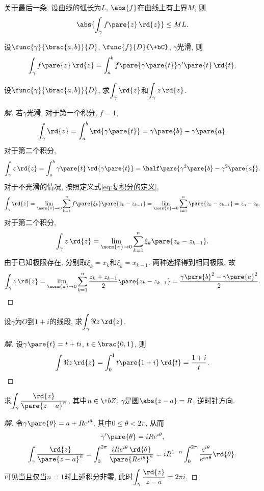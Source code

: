 \documentclass[../ComplexVariable.tex]{subfiles}
\begin{document}
关于最后一条, 设曲线的弧长为$L$, $\abs{f}$在曲线上有上界$M$, 则
\[ \abs{\int_\gamma f\pare{z}\,\rd{z}} \le ML. \]
\begin{proposition}
    设$\func{\gamma}{\brac{a,b}}{D}$, $\func{f}{D}{\+bC}$, $\gamma$光滑, 则
    \[ \int_\gamma f\pare{z}\,\rd{z} = \int_a^b f\pare{\gamma\pare{t}}\gamma'\pare{t}\,\rd{t}. \]
\end{proposition}
\begin{sample}
    \begin{ex}
        \label{ex:基本曲线积分}
        设$\func{\gamma}{\brac{a,b}}{D}$, 求$\displaystyle \int_\gamma\rd{z}$和$\displaystyle\int_\gamma z\,\rd{z}$.
    \end{ex}
    \begin{proof}[解]
        若$\gamma$光滑, 对于第一个积分, $f=1$,
        \[ \int_\gamma\rd{z} = \int_a^b \rd{\gamma\pare{t}} = \gamma\pare{b} - \gamma\pare{a}. \]
        对于第二个积分,
        \[ \int_\gamma z\,\rd{z} = \int_a^b \gamma\pare{t}\,\rd{\gamma\pare{t}} = \half\pare{\gamma^2\pare{b} - \gamma^2\pare{a}}. \]
        对于不光滑的情况, 按照定义式\eqref{eq:复积分的定义},
        \[ \int_\gamma \rd{z} = \lim_{\norm{\pi}\rightarrow 0}\sum_{k=1}^n f\pare{\xi_k}\pare{z_k - z_{k-1}} = \lim_{\norm{\pi}\rightarrow 0} \sum_{i=1}^n \pare{z_k - z_{k-1}} = z_n - z_0. \]
        对于第二个积分,
        \[ \int_\gamma z\,\rd{z} = \lim_{\norm{\pi}\rightarrow 0} \sum_{k=1}^n \xi_k \pare{z_k - z_{k-1}}. \]
        由于已知极限存在, 分别取$\xi_k = x_k$和$\xi_k = x_{k-1}$. 两种选择得到相同极限, 故
        \[ \int_\gamma z\,\rd{z} = \lim_{\norm{\pi}\rightarrow 0} \sum_{k=1}^n \frac{z_k+z_{k-1}}{2}\pare{z_k - z_{k-1}} = \frac{\gamma\pare{b}^2 - \gamma\pare{a}^2}{2}. \qedhere \] 
    \end{proof}
\end{sample}
\begin{sample}
    \begin{ex}
        设$\gamma$为$O$到$1+i$的线段, 求$\displaystyle \int_\gamma \Re z\,\rd{z}$.
    \end{ex}
    \begin{proof}[解]
        设$\gamma\pare{t} = t+ti$, $t\in\brac{0,1}$, 则
        \[ \int \Re z\,\rd{z} = \int_0^1 t\pare{1+i}\,\rd{t} = \frac{1+i}{t}. \qedhere \]
    \end{proof}
\end{sample}
\begin{sample}
    \begin{ex}
        求$\displaystyle \int_\gamma \frac{\rd{z}}{\pare{z-a}^n}$, 其中$n\in \+bZ$, $\gamma$是圆$\abs{z-a}=R$, 逆时针方向.
    \end{ex}
    \begin{proof}[解]
        令$\gamma\pare{\theta} = a+Re^{i\theta}$, 其中$0\le \theta < 2\pi$, 从而
        \[ \gamma'\pare{\theta} = iRe^{i\theta}, \]
        \[ \int_\gamma \frac{\rd{z}}{\pare{z-a}^n} = \int_0^{2\pi} \frac{iRe^{i\theta}\,\rd{\theta}}{\pare{Re^{i\theta}}^n} = iR^{1-n}\int_0^{2\pi} \frac{e^{i\theta}}{e^{in\theta}}\rd{\theta}. \]
        可见当且仅当$n=1$时上述积分非零, 此时$\displaystyle \int_\gamma \frac{\rd{z}}{z-a} = 2\pi i$.
    \end{proof}
\end{sample}
\end{document}
